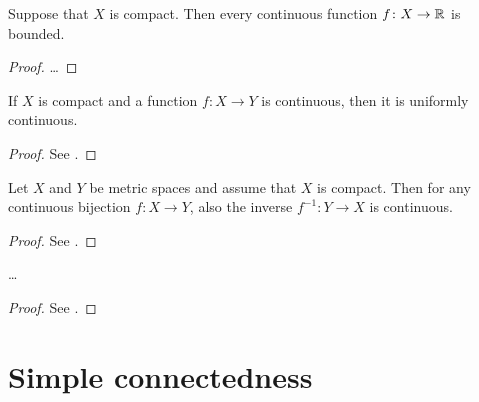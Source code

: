 \begin{theorem}
  \label{thm:continuous_on_compact_implies_bounded}
  Suppose that $X$ is compact.
  Then every continuous function $f \colon X \to \mathbb{R}$
  is bounded.
\end{theorem}
\begin{proof}
  \ldots
\end{proof}

\begin{lemma}
  \label{lem:on_compact_continuous_implies_uniformly_continuous}
  If $X$ is compact and a function $f \colon X \to Y$ is continuous, then it is uniformly continuous.
\end{lemma}
\begin{proof}
  See \MetSpCourse{}.
\end{proof}

\begin{lemma}
  \label{lem:continuous_bijection_homeomorphism}
  Let $X$ and $Y$ be metric spaces and assume that $X$ is compact.
  Then for any continuous bijection $f \colon X \to Y$,
  also the inverse $f^{-1} \colon Y \to X$ is continuous.
\end{lemma}
\begin{proof}
  See \MetSpCourse{}.
\end{proof}

\begin{theorem}
  \label{thm:intersect_nested_compacts}
  \ldots
\end{theorem}
\begin{proof}
  See \MetSpCourse{}.
\end{proof}



\section{Simple connectedness}


